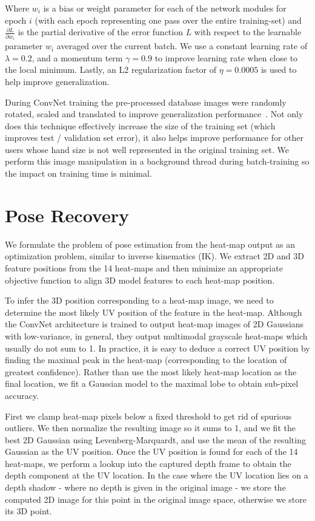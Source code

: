 Where $w_i$ is a bias or weight parameter for each of the network modules for epoch $i$ (with each epoch representing one pass over the entire training-set) and $\frac{\partial L}{\partial w_i}$ is the partial derivative of the error function $L$ with respect to the learnable parameter $w_i$ averaged over the current batch. We use a constant learning rate of $\lambda = 0.2$, and a momentum term $\gamma=0.9$ to improve learning rate when close to the local minimum. Lastly, an L2 regularization factor of $\eta=0.0005$ is used to help improve generalization.

During ConvNet training the pre-processed database images were randomly rotated, scaled and translated to improve generalization performance~\cite{Farabet}. Not only does this technique effectively increase the size of the training set (which improves test / validation set error), it also helps improve performance for other users whose hand size is not well represented in the original training set. We perform this image manipulation in a background thread during batch-training so the impact on training time is minimal.

\section{Pose Recovery}
\label{sec:realtimeposedetection}

We formulate the problem of pose estimation from the heat-map output as an optimization problem, similar to inverse kinematics (IK). We extract 2D and 3D feature positions from the 14 heat-maps and then minimize an appropriate objective function to align 3D model features to each heat-map position.

To infer the 3D position corresponding to a heat-map image, we need to determine the most likely UV position of the feature in the heat-map. Although the ConvNet architecture is trained to output heat-map images of 2D Gaussians with low-variance, in general, they output multimodal grayscale heat-maps which usually do not sum to 1. In practice, it is easy to deduce a correct UV position by finding the maximal peak in the heat-map (corresponding to the location of greatest confidence). Rather than use the most likely heat-map location as the final location, we fit a Gaussian model to the maximal lobe to obtain sub-pixel accuracy.

First we clamp heat-map pixels below a fixed threshold to get rid of spurious outliers. We then normalize the resulting image so it sums to 1, and we fit the best 2D Gaussian using Levenberg-Marquardt, and use the mean of the resulting Gaussian as the UV position. Once the UV position is found for each of the 14 heat-maps, we perform a lookup into the captured depth frame to obtain the depth component at the UV location. In the case where the UV location lies on a depth shadow - where no depth is given in the original image - we store the computed 2D image for this point in the original image space, otherwise we store its 3D point.

